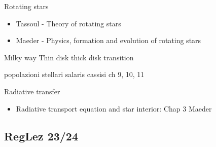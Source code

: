 \begin{frame}{Rotating stars}
\begin{itemize}
\item Tassoul - Theory of rotating stars
\item Maeder - Physics, formation and evolution of rotating stars
\end{itemize}
\end{frame}

\begin{frame}{Milky way}
Thin disk thick disk transition
\end{frame}

\begin{frame}{popolazioni stellari}
salaris cassisi ch 9, 10, 11
\end{frame}

\begin{frame}{Radiative transfer}
    \begin{itemize}
        \item Radiative transport equation and star interior: Chap 3 Maeder
    \end{itemize}
\end{frame}
\subsection{RegLez 23/24}

